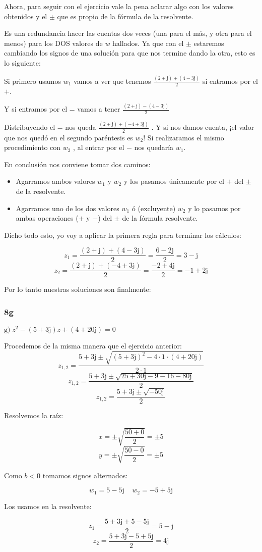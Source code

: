 \documentclass[11pt]{article}
\def\imj{\mathrm{j}}
\begin{document}
	Ahora, para seguir con el ejercicio vale la pena aclarar algo con los valores obtenidos y el $\pm$ que es propio de la fórmula de la resolvente. 
	
	Es una redundancia hacer las cuentas dos veces (una para el más, y otra para el menos) para los DOS valores de $w$ hallados. Ya que con el $\pm$ estaremos cambiando los signos de una solución para que nos termine dando la otra, esto es lo siguiente:
	
	\begin{center}
		Si primero usamos $w_{1}$ vamos a ver que tenemos $\displaystyle{\frac{(2+\imj)+(4-3\imj)}{2}}$ si entramos por el $+$.
		
		Y si entramos por el $-$ vamos a tener $\displaystyle{\frac{(2+\imj)-(4-3\imj)}{2}}$
		
		Distribuyendo el $-$ nos queda $\displaystyle{\frac{(2+\imj)+(-4+3\imj)}{2}}$ . Y si nos damos cuenta, ¡el valor que nos quedó en el segundo paréntesis es $w_{2}$! Si realizaramos el mismo procedimiento con $w_{2}$ , al entrar por el $-$ nos quedaría $w_{1}$.
	\end{center}
	En conclusión nos conviene tomar dos caminos:
	\begin{itemize}
		\item Agarramos ambos valores $w_{1}$ y $w_{2}$ y los pasamos únicamente por el $+$ del $\pm$ de la resolvente.
		\item Agarramos uno de los dos valores $w_{1}$ ó (excluyente) $w_{2}$ y lo pasamos por ambas operaciones ($+$ y $-$) del $\pm$ de la fórmula resolvente.
	\end{itemize}
	
	Dicho todo esto, yo voy a aplicar la primera regla para terminar los cálculos:
	
	$$z_{1}=\frac{(2+\imj)+(4-3\imj)}{2}=\frac{6-2\imj}{2}=3-\imj$$
	$$z_{2}=\frac{(2+\imj)+(-4+3\imj)}{2}=\frac{-2+4\imj}{2}=-1+2\imj$$
	
	Por lo tanto nuestras soluciones son finalmente:
	\fcolorbox{black}{yellow}{$z_{1}=3-\imj\;\;\;\;z_{2}=-1+2\imj$}
	
	\subsubsection{8g}
	$\mathrm{g)} \; z^{2}-(5+3\imj)z+(4+20\imj)=0$
	
	Procedemos de la misma manera que el ejercicio anterior:
	$$\displaystyle{z_{1,2}=\frac{5+3\imj \pm \sqrt{(5+3\imj)^2-4\cdot 1 \cdot (4+20\imj)}}{2\cdot 1}}$$
	$$\displaystyle{z_{1,2}=\frac{5+3\imj \pm \sqrt{25+30\imj-9 -16-80\imj}}{2}}$$
	$$\displaystyle{z_{1,2}=\frac{5+3\imj \pm \sqrt{-50\imj}}{2}}$$
	\begin{center}
		Resolvemos la raíz:
	\end{center}
	$$x=\pm \sqrt{\frac{50+0}{2}}=\pm5$$
	$$y=\pm \sqrt{\frac{50-0}{2}}=\pm5$$
	\begin{center}
		Como $b<0$ tomamos signos alternados:
	\end{center}
	$$w_{1}=5-5\imj\;\;\;\;w_{2}=-5+5\imj$$
	\begin{center}
		Los usamos en la resolvente:
	\end{center}
	$$z_{1}=\frac{5+3\imj+5-5\imj}{2}=5-\imj$$
	$$z_{2}=\frac{5+3\imj-5+5\imj}{2}=4\imj$$
	
\end{document}
